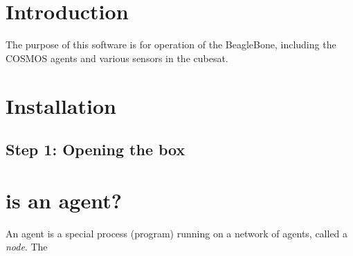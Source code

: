 \hypertarget{index_intro_sec}{}\section{Introduction}\label{index_intro_sec}
The purpose of this software is for operation of the Beagle\+Bone, including the C\+O\+S\+M\+OS agents and various sensors in the cubesat.\hypertarget{index_install_sec}{}\section{Installation}\label{index_install_sec}
\hypertarget{index_step1}{}\subsection{Step 1\+: Opening the box}\label{index_step1}
\hypertarget{index_What}{}\section{is an agent?}\label{index_What}
An agent is a special process (program) running on a network of agents, called a {\itshape node}. The 
